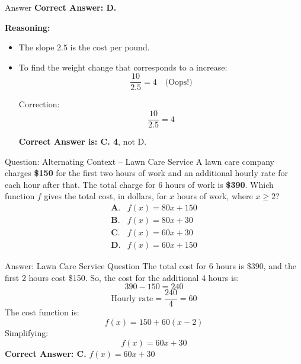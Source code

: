 \documentclass{beamer}
\begin{document}
\begin{frame}{Answer }
\textbf{Correct Answer: \textcolor{novelPurple}{D.}}

\vspace{0.5em}
\textbf{Reasoning:}
\begin{itemize}
    \item The slope \( 2.5 \) is the cost per pound.
    \item To find the weight change that corresponds to a  increase:
    \[
    \frac{10}{2.5} = 4 \quad \text{(Oops!)}
    \]

    Correction:
    \[
    \frac{10}{2.5} = \boxed{4}
    \]

    \textbf{Correct Answer is: \textcolor{novelPurple}{C. 4}}, not D.
\end{itemize}
\end{frame}








\begin{frame}{Question: Alternating Context – Lawn Care Service}
    A lawn care company charges \textbf{\$150} for the first two hours of work and an additional hourly rate for each hour after that. The total charge for 6 hours of work is \textbf{\$390}.  
    Which function \( f \) gives the total cost, in dollars, for \( x \) hours of work, where \( x \geq 2 \)?
    \[
    \begin{array}{ll}
    \textbf{A.} & f(x) = 80x + 150 \\
    \textbf{B.} & f(x) = 80x + 30 \\
    \textbf{C.} & f(x) = 60x + 30 \\
    \textbf{D.} & f(x) = 60x + 150
    \end{array}
    \]
\end{frame}
\begin{frame}{Answer: Lawn Care Service Question}
    The total cost for 6 hours is \$390, and the first 2 hours cost \$150.  
    So, the cost for the additional 4 hours is:
    \[
    390 - 150 = 240
    \]
    \[
    \text{Hourly rate} = \frac{240}{4} = 60
    \]
    The cost function is:
    \[
    f(x) = 150 + 60(x - 2)
    \]
    Simplifying:
    \[
    f(x) = 60x + 30
    \]
    \textbf{Correct Answer: C.} \( f(x) = 60x + 30 \)
\end{frame}
\end{document}
